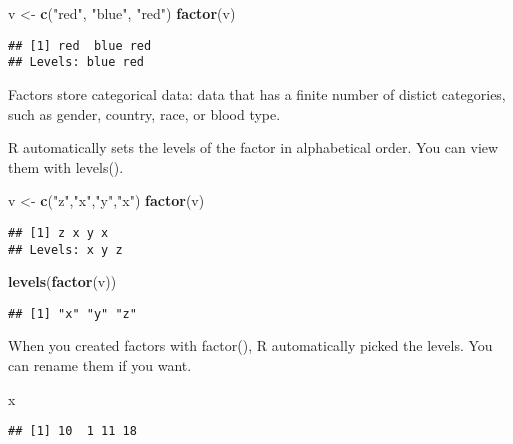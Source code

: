 \documentclass[
]{article}
\newenvironment{Shaded}{\begin{snugshade}}{\end{snugshade}}
\newcommand{\KeywordTok}[1]{\textcolor[rgb]{0.13,0.29,0.53}{\textbf{#1}}}
\newcommand{\NormalTok}[1]{#1}
\newcommand{\StringTok}[1]{\textcolor[rgb]{0.31,0.60,0.02}{#1}}
\begin{document}
\begin{Shaded}
\begin{Highlighting}[]
\NormalTok{v <-}\StringTok{ }\KeywordTok{c}\NormalTok{(}\StringTok{"red"}\NormalTok{, }\StringTok{"blue"}\NormalTok{, }\StringTok{"red"}\NormalTok{)}
\KeywordTok{factor}\NormalTok{(v)}
\end{Highlighting}
\end{Shaded}

\begin{verbatim}
## [1] red  blue red 
## Levels: blue red
\end{verbatim}

Factors store categorical data: data that has a finite number of distict
categories, such as gender, country, race, or blood type.

R automatically sets the levels of the factor in alphabetical order. You
can view them with levels().

\begin{Shaded}
\begin{Highlighting}[]
\NormalTok{v <-}\StringTok{ }\KeywordTok{c}\NormalTok{(}\StringTok{"z"}\NormalTok{,}\StringTok{"x"}\NormalTok{,}\StringTok{"y"}\NormalTok{,}\StringTok{"x"}\NormalTok{)}
\KeywordTok{factor}\NormalTok{(v)}
\end{Highlighting}
\end{Shaded}

\begin{verbatim}
## [1] z x y x
## Levels: x y z
\end{verbatim}

\begin{Shaded}
\begin{Highlighting}[]
\KeywordTok{levels}\NormalTok{(}\KeywordTok{factor}\NormalTok{(v))}
\end{Highlighting}
\end{Shaded}

\begin{verbatim}
## [1] "x" "y" "z"
\end{verbatim}

When you created factors with factor(), R automatically picked the
levels. You can rename them if you want.

\begin{Shaded}
\begin{Highlighting}[]
\NormalTok{x}
\end{Highlighting}
\end{Shaded}

\begin{verbatim}
## [1] 10  1 11 18
\end{verbatim}
\end{document}

